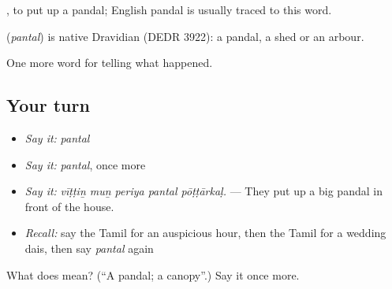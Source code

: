  , to put up a pandal; English pandal is usually traced to this word.

\begin{cousinweb}
\textbf{} (\emph{pantal}) is native Dravidian (DEDR 3922): a pandal, a shed or an arbour.
\end{cousinweb}

\begin{grammarlens}[title={What you've built}]
One more word for telling what happened.
\end{grammarlens}

\subsection*{Your turn}
\begin{itemize}
\raggedright
  \item \emph{Say it:} \emph{pantal}
  \item \emph{Say it:} \emph{pantal}, once more
  \item \emph{Say it:} \emph{vīṭṭiṉ muṉ periya pantal pōṭṭārkaḷ.} — They put up a big pandal in front of the house.
  \item \emph{Recall:} say the Tamil for an auspicious hour, then the Tamil for a wedding dais, then say \emph{pantal} again
\end{itemize}

\begin{tcolorbox}[breakable,colback=teal!4,colframe=teal!35!black,title={Before you move on}]
What does  mean? (\textquotedblleft{}A pandal; a canopy\textquotedblright{}.) Say it once more.
\end{tcolorbox}
